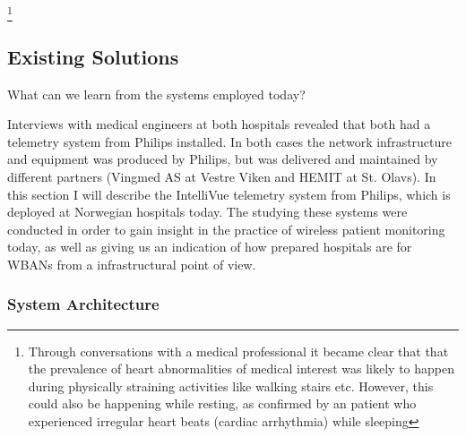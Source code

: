 
\footnote{Through conversations with a medical professional it became clear that that the prevalence of heart abnormalities of medical interest was likely to happen during physically straining activities like walking stairs etc. However, this could also be happening while resting, as confirmed by an patient who experienced irregular heart beats (cardiac arrhythmia) while sleeping}



\subsection{Existing Solutions} %
\label{sub:existing_solutions}

What can we learn from the systems employed today?

Interviews with medical engineers at both hospitals revealed that both had a telemetry system from Philips installed. In both cases the network infrastructure and equipment was produced by Philips, but was delivered and maintained by different partners (Vingmed AS at Vestre Viken and HEMIT at St. Olavs). In this section I will describe the IntelliVue telemetry system from Philips, which is deployed at Norwegian hospitals today. The studying these systems were conducted in order to gain insight in the practice of wireless patient monitoring today, as well as giving us an indication of how prepared hospitals are for WBANs from a infrastructural point of view.

\subsubsection{System Architecture} %
\label{ssub:system_architecture}

